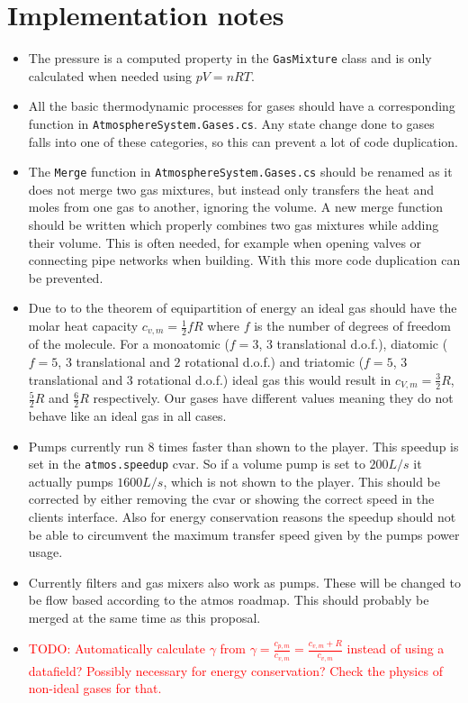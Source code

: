 \documentclass[12pt,a4paper]{article}
\newcommand\todo[1]{\textcolor{red}{TODO: #1}}
\numberwithin{equation}{section}
\begin{document}
\section{Implementation notes}
\begin{itemize}
\item The pressure is a computed property in the \texttt{GasMixture} class and is only calculated when needed using $pV=nRT$.
\item All the basic thermodynamic processes for gases should have a corresponding function in \texttt{AtmosphereSystem.Gases.cs}. Any state change done to gases falls into one of these categories, so this can prevent a lot of code duplication.
\item The \texttt{Merge} function in  \texttt{AtmosphereSystem.Gases.cs} should be renamed as it does not merge two gas mixtures, but instead only transfers the heat and moles from one gas to another, ignoring the volume. A new merge function should be written which properly combines two gas mixtures while adding their volume. This is often needed, for example when opening valves or connecting pipe networks when building. With this more code duplication can be prevented.
\item Due to to the theorem of equipartition of energy an ideal gas should have the molar heat capacity $c_{v,m}=\frac{1}{2}fR$ where $f$ is the number of degrees of freedom of the molecule. For a monoatomic ($f=3$, $3$ translational d.o.f.), diatomic ($f=5$, $3$ translational and $2$ rotational d.o.f.) and triatomic ($f=5$, $3$ translational and $3$ rotational d.o.f.) ideal gas this would result in $c_{V,m}=\frac{3}{2}R$, $\frac{5}{2}R$ and $\frac{6}{2}R$ respectively. Our gases have different values meaning they do not behave like an ideal gas in all cases.
\item Pumps currently run 8 times faster than shown to the player. This speedup is set in the \texttt{atmos.speedup} cvar. So if a volume pump is set to $200 L/s$ it actually pumps $1600 L/s$, which is not shown to the player. This should be corrected by either removing the cvar or showing the correct speed in the clients interface. Also for energy conservation reasons the speedup should not be able to circumvent the maximum transfer speed given by the pumps power usage.
\item Currently filters and gas mixers also work as pumps. These will be changed to be flow based according to the atmos roadmap. This should probably be merged at the same time as this proposal.
\item \todo{Automatically calculate $\gamma$ from $\gamma=\frac{c_{p,m}}{c_{v,m}}=\frac{c_{v,m}+R}{c_{v,m}}$ instead of using a datafield? Possibly necessary for energy conservation? Check the physics of non-ideal gases for that.}
\end{itemize}


%
%
\end{document}
